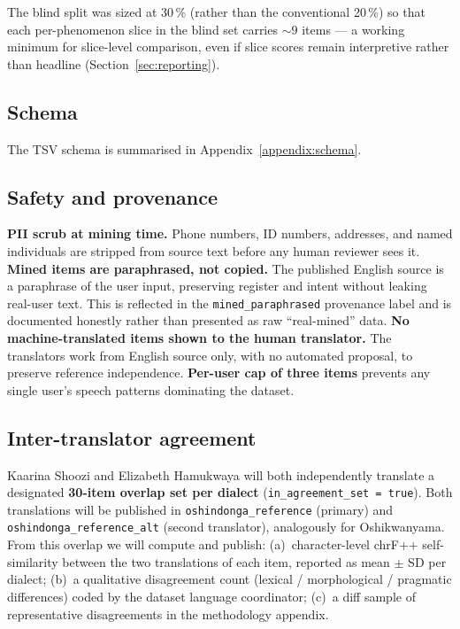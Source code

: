 \documentclass[11pt]{article}
\begin{document}
The blind split was sized at 30\,\% (rather than the conventional
20\,\%) so that each per-phenomenon slice in the blind set carries
$\sim 9$ items --- a working minimum for slice-level comparison,
even if slice scores remain interpretive rather than headline
(Section~\ref{sec:reporting}).

\subsection{Schema}
\label{sec:schema}

The TSV schema is summarised in Appendix~\ref{appendix:schema}.

\subsection{Safety and provenance}

\textbf{PII scrub at mining time.} Phone numbers, ID numbers,
addresses, and named individuals are stripped from source text
before any human reviewer sees it. \textbf{Mined items are
paraphrased, not copied.} The published English source is a
paraphrase of the user input, preserving register and intent without
leaking real-user text. This is reflected in the
\texttt{mined\_paraphrased} provenance label and is documented
honestly rather than presented as raw ``real-mined'' data.
\textbf{No machine-translated items shown to the human translator.}
The translators work from English source only, with no automated
proposal, to preserve reference independence. \textbf{Per-user cap
of three items} prevents any single user's speech patterns
dominating the dataset.

\subsection{Inter-translator agreement}
\label{sec:iaa}

Kaarina Shoozi and Elizabeth Hamukwaya will both independently
translate a designated \textbf{30-item overlap set per dialect}
(\texttt{in\_agreement\_set = true}). Both translations will be
published in \texttt{oshindonga\_reference} (primary) and
\texttt{oshindonga\_reference\_alt} (second translator),
analogously for Oshikwanyama. From this overlap we will compute and
publish: (a)~character-level chrF++ self-similarity between the two
translations of each item, reported as mean $\pm$ SD per dialect;
(b)~a qualitative disagreement count (lexical / morphological /
pragmatic differences) coded by the dataset language coordinator;
(c)~a diff sample of representative disagreements in the
methodology appendix.
\end{document}
